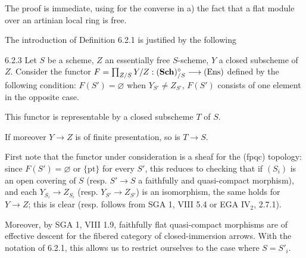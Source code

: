 The proof is immediate, using for the converse in a) the fact that a flat module over an artinian local ring is free.

The introduction of Definition 6.2.1 is justified by the following
\begin{theorem}{6.2.3}\label{VIB.6.2.3}
Let $S$ be a scheme, $Z$ an essentially free $S$-scheme, $Y$ a closed subscheme of $Z$. Consider the functor $F=\prod_{Z/S}Y/Z:(\mathbf{Sch})^\circ_{/S}\longrightarrow\textup{(Ens)}$ defined by the following condition: $F(S')=\varnothing$ when $Y_{S'}\ne Z_{S'}$, $F(S')$ consists of one element in the opposite case.
\begin{enumeratei}
\item This functor is representable by a closed subscheme $T$ of $S$.
\item If moreover $Y\to Z$ is of finite presentation, so is $T\to S$.
\end{enumeratei}
\end{theorem}
First note that the functor under consideration is a sheaf for the (fpqc) topology: since $F(S')=\varnothing$ or $\{\mathrm{pt}\}$ for every $S'$, this reduces to checking that if $(S_i)$ is an open covering of $S$ (resp. $S'\to S$ a faithfully and quasi-compact morphism), and each $Y_{S_i}\to Z_{S_i}$ (resp. $Y_{S'}\to Z_{S'}$) is an isomorphism, the same holds for $Y\to Z$; this is clear (resp. follows from SGA 1, VIII 5.4 or EGA IV$_2$, 2.7.1).

Moreover, by SGA 1, VIII 1.9, faithfully flat quasi-compact morphisms are of effective descent for the fibered category of closed-immersion arrows. With the notation of 6.2.1, this allows us to restrict ourselves to the case where $S=S'_i$.

